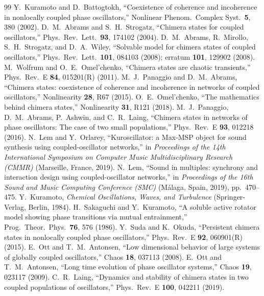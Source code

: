 \documentclass[aip,preprint,amsmath,amssymb]{revtex4-2}
\begin{document}
\begin{thebibliography}{99}
 Y.~Kuramoto and D.~Battogtokh, ``Coexistence of coherence and incoherence in nonlocally coupled phase oscillators,'' Nonlinear Phenom.\ Complex Syst.\ \textbf{5}, 380 (2002).
 D.~M.~Abrams and S.~H.~Strogatz, ``Chimera states for coupled oscillators,'' Phys.\ Rev.\ Lett.\ \textbf{93}, 174102 (2004).
 D.~M.~Abrams, R.~Mirollo, S.~H.~Strogatz, and D.~A.~Wiley, ``Solvable model for chimera states of coupled oscillators,'' Phys.\ Rev.\ Lett.\ \textbf{101}, 084103 (2008); erratum \textbf{101}, 129902 (2008).
 M.~Wolfrum and O.~E.~Omel'chenko, ``Chimera states are chaotic transients,'' Phys.\ Rev.\ E \textbf{84}, 015201(R) (2011).
 M.~J.~Panaggio and D.~M.~Abrams, ``Chimera states: coexistence of coherence and incoherence in networks of coupled oscillators,'' Nonlinearity \textbf{28}, R67 (2015).
 O.~E.~Omel'chenko, ``The mathematics behind chimera states,'' Nonlinearity \textbf{31}, R121 (2018).
 M.~J.~Panaggio, D.~M.~Abrams, P.~Ashwin, and C.~R.~Laing, ``Chimera states in networks of phase oscillators: The case of two small populations,'' Phys.\ Rev.\ E \textbf{93}, 012218 (2016).
 N.~Lem and Y.~Orlarey, ``Kuroscillator: a Max-MSP object for sound synthesis using coupled-oscillator networks,'' in \emph{Proceedings of the 14th International Symposium on Computer Music Multidisciplinary Research (CMMR)} (Marseille, France, 2019).
 N.~Lem, ``Sound in multiples: synchrony and interaction design using coupled-oscillator networks,'' in \emph{Proceedings of the 16th Sound and Music Computing Conference (SMC)} (M\'alaga, Spain, 2019), pp.\ 470--475.
 Y.~Kuramoto, \emph{Chemical Oscillations, Waves, and Turbulence} (Springer-Verlag, Berlin, 1984).
 H.~Sakaguchi and Y.~Kuramoto, ``A soluble active rotator model showing phase transitions via mutual entrainment,'' Prog.\ Theor.\ Phys.\ \textbf{76}, 576 (1986).
 Y.~Suda and K.~Okuda, ``Persistent chimera states in nonlocally coupled phase oscillators,'' Phys.\ Rev.\ E \textbf{92}, 060901(R) (2015).
 E.~Ott and T.~M.~Antonsen, ``Low dimensional behavior of large systems of globally coupled oscillators,'' Chaos \textbf{18}, 037113 (2008).
 E.~Ott and T.~M.~Antonsen, ``Long time evolution of phase oscillator systems,'' Chaos \textbf{19}, 023117 (2009).
 C.~R.~Laing, ``Dynamics and stability of chimera states in two coupled populations of oscillators,'' Phys.\ Rev.\ E \textbf{100}, 042211 (2019).

\end{thebibliography}
\end{document}
